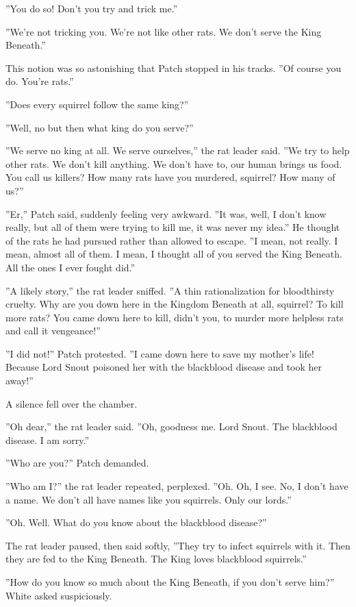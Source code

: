 \documentclass[12pt]{book}
\begin{document}
''You do so! Don't you try and trick me.''

''We're not tricking you. We're not like other rats. We don't serve the King Beneath.''

This notion was so astonishing that Patch stopped in his tracks. ''Of course you do. You're rats.''

''Does every squirrel follow the same king?''

''Well, no %
but %
then what king do you serve?''

''We serve no king at all. We serve ourselves,'' the rat leader said. ''We try to help other rats. We don't kill anything. We don't have to, our human brings us food. You call us killers? How many rats have you murdered, squirrel? How many of us?''

''Er,'' Patch said, suddenly feeling very awkward. ''It was, well, I don't know really, but all of them were trying to kill me, it was never my idea.'' He thought of the rats he had pursued rather than allowed to escape. ''I mean, not really. I mean, almost all of them. I mean, I thought all of you served the King Beneath. All the ones I ever fought did.''

''A likely story,'' the rat leader sniffed. ''A thin rationalization for bloodthirsty cruelty. Why are you down here in the Kingdom Beneath at all, squirrel? To kill more rats? You came down here to kill, didn't you, to murder more helpless rats and call it vengeance!''

''I did not!'' Patch protested. ''I came down here to save my mother's life! Because Lord Snout poisoned her with the blackblood disease and took her away!''

A silence fell over the chamber.

''Oh dear,'' the rat leader said. ''Oh, goodness me. Lord Snout. The blackblood disease. I am sorry.''

''Who are you?'' Patch demanded.

''Who am I?'' the rat leader repeated, perplexed. ''Oh. Oh, I see. No, I don't have a name. We don't all have names like you squirrels. Only our lords.''

''Oh. Well. What do you know about the blackblood disease?''

The rat leader paused, then said softly, ''They try to infect squirrels with it. Then they are fed to the King Beneath. The King loves blackblood squirrels.''

''How do you know so much about the King Beneath, if you don't serve him?'' White asked suspiciously.
\end{document}
